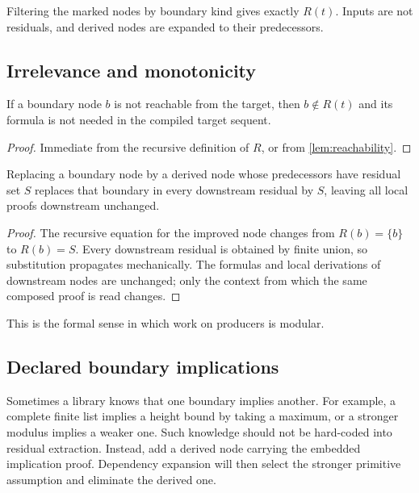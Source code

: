 Filtering the marked nodes by boundary kind gives exactly \(R(t)\).  Inputs are not residuals, and derived nodes are expanded to their predecessors.

\subsection{Irrelevance and monotonicity}

\begin{proposition}
If a boundary node \(b\) is not reachable from the target, then \(b\notin R(t)\) and its formula is not needed in the compiled target sequent.
\end{proposition}

\begin{proof}
Immediate from the recursive definition of \(R\), or from \cref{lem:reachability}.
\end{proof}

\begin{proposition}
Replacing a boundary node by a derived node whose predecessors have residual set \(S\) replaces that boundary in every downstream residual by \(S\), leaving all local proofs downstream unchanged.
\end{proposition}

\begin{proof}
The recursive equation for the improved node changes from \(R(b)=\{b\}\) to \(R(b)=S\).  Every downstream residual is obtained by finite union, so substitution propagates mechanically.  The formulas and local derivations of downstream nodes are unchanged; only the context from which the same composed proof is read changes.
\end{proof}

This is the formal sense in which work on producers is modular.

\subsection{Declared boundary implications}

Sometimes a library knows that one boundary implies another.  For example, a complete finite list implies a height bound by taking a maximum, or a stronger modulus implies a weaker one.  Such knowledge should not be hard-coded into residual extraction.  Instead, add a derived node carrying the embedded implication proof.  Dependency expansion will then select the stronger primitive assumption and eliminate the derived one.

